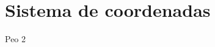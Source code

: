 \documentclass[../main.tex]{subfiles}
\begin{document}
\section{Sistema de coordenadas}
Peo 2
 
\end{document}

